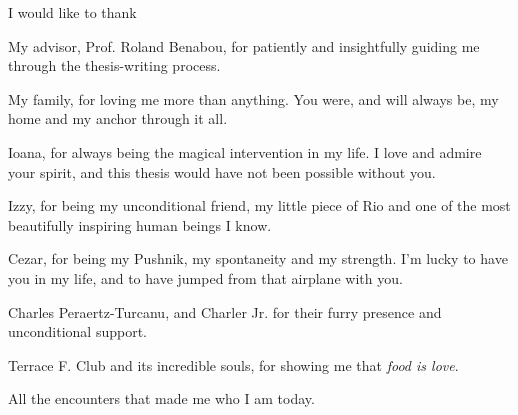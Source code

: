 I would like to thank 

My advisor, Prof. Roland Benabou, for patiently and insightfully guiding me through the thesis-writing process. \par

My family, for loving me more than anything. You were, and will always be, my home and my anchor through it all. \par

Ioana, for always being the magical intervention in my life. I love and admire your spirit, and this thesis would have not been possible without you. \par

Izzy, for being my unconditional friend, my little piece of Rio and one of the most beautifully inspiring human beings I know. 

Cezar, for being my Pushnik, my spontaneity and my strength. I'm lucky to have you in my life, and to have jumped from that airplane with you. \par

Charles Peraertz-Turcanu, and Charler Jr. for their furry presence and unconditional support. \par

Terrace F. Club and its incredible souls, for showing me that \textit{food is love}.\par

All the encounters that made me who I am today.

